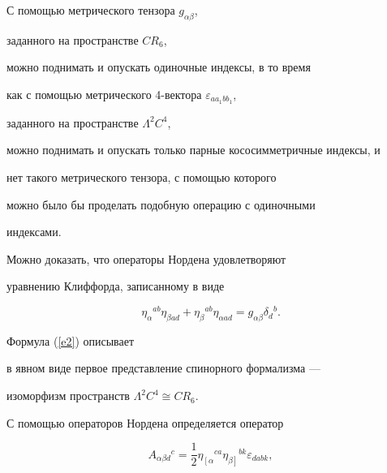 \begin{note}


\label{note1}


С помощью метрического тензора $g_{\alpha\beta}$,


заданного на пространстве $CR_6$,


можно поднимать и опускать одиночные индексы, в то время


как с помощью метрического 4-вектора $\varepsilon_{aa_1bb_1}$,


заданного на пространстве $\Lambda^2C^4$,


можно поднимать и опускать только парные кососимметричные индексы, и


нет такого метрического тензора, с помощью которого


можно было бы проделать подобную операцию с одиночными


индексами.


\end{note}





Можно доказать, что операторы Нордена удовлетворяют


уравнению Клиффорда, записанному в виде


\begin{equation}


\label{e0}


\eta_\alpha{}^{ab}\eta_{\beta ad}+\eta_\beta{}^{ab}\eta_{\alpha ad}=


g_{\alpha\beta}\delta_d{}^b.


\end{equation}





Формула (\ref{e2}) описывает


в явном виде первое представление спинорного формализма ---


изоморфизм пространств $\Lambda^2C^4\cong CR_6$.





С помощью операторов Нордена определяется оператор


$$


A_{\alpha \beta d}{}^c=


\frac{1}{2}\eta_{\left[\alpha \right.}{}^{ca}\eta_{\left.


\beta \right]}{}^{bk}\varepsilon_{dabk},


$$


